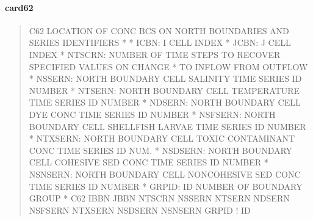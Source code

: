 \documentclass[letterpaper,10pt,english]{sphinxmanual}
\begin{document}
\paragraph{card62}
\label{\detokenize{inputfiles/runcontrol/card62:card62}}\label{\detokenize{inputfiles/runcontrol/card62::doc}}\begin{quote}

\begin{sphinxVerbatim}[commandchars=\\\{\}]
\PYGZhy{}\PYGZhy{}\PYGZhy{}\PYGZhy{}\PYGZhy{}\PYGZhy{}\PYGZhy{}\PYGZhy{}\PYGZhy{}\PYGZhy{}\PYGZhy{}\PYGZhy{}\PYGZhy{}\PYGZhy{}\PYGZhy{}\PYGZhy{}\PYGZhy{}\PYGZhy{}\PYGZhy{}\PYGZhy{}\PYGZhy{}\PYGZhy{}\PYGZhy{}\PYGZhy{}\PYGZhy{}\PYGZhy{}\PYGZhy{}\PYGZhy{}\PYGZhy{}\PYGZhy{}\PYGZhy{}\PYGZhy{}\PYGZhy{}\PYGZhy{}\PYGZhy{}\PYGZhy{}\PYGZhy{}\PYGZhy{}\PYGZhy{}\PYGZhy{}\PYGZhy{}\PYGZhy{}\PYGZhy{}\PYGZhy{}\PYGZhy{}\PYGZhy{}\PYGZhy{}\PYGZhy{}\PYGZhy{}\PYGZhy{}\PYGZhy{}\PYGZhy{}\PYGZhy{}\PYGZhy{}\PYGZhy{}\PYGZhy{}\PYGZhy{}\PYGZhy{}\PYGZhy{}\PYGZhy{}\PYGZhy{}\PYGZhy{}\PYGZhy{}\PYGZhy{}\PYGZhy{}\PYGZhy{}\PYGZhy{}\PYGZhy{}\PYGZhy{}\PYGZhy{}\PYGZhy{}\PYGZhy{}\PYGZhy{}\PYGZhy{}\PYGZhy{}\PYGZhy{}\PYGZhy{}\PYGZhy{}
C62 LOCATION OF CONC BC\PYGZsq{}S ON NORTH BOUNDARIES AND SERIES IDENTIFIERS
*
*  ICBN:    I CELL INDEX
*  JCBN:    J CELL INDEX
*  NTSCRN:  NUMBER OF TIME STEPS TO RECOVER SPECIFIED VALUES ON CHANGE
*           TO INFLOW FROM OUTFLOW
*  NSSERN:  NORTH BOUNDARY CELL SALINITY TIME SERIES ID NUMBER
*  NTSERN:  NORTH BOUNDARY CELL TEMPERATURE TIME SERIES ID NUMBER
*  NDSERN:  NORTH BOUNDARY CELL DYE CONC TIME SERIES ID NUMBER
*  NSFSERN: NORTH BOUNDARY CELL SHELLFISH LARVAE TIME SERIES ID NUMBER
*  NTXSERN: NORTH BOUNDARY CELL TOXIC CONTAMINANT CONC TIME SERIES ID NUM.
*  NSDSERN: NORTH BOUNDARY CELL COHESIVE SED CONC TIME SERIES ID NUMBER
*  NSNSERN: NORTH BOUNDARY CELL NON\PYGZhy{}COHESIVE SED CONC TIME SERIES ID NUMBER
*    GRPID: ID NUMBER OF BOUNDARY GROUP
*
C62    IBBN    JBBN  NTSCRN  NSSERN  NTSERN  NDSERN NSFSERN NTXSERN NSDSERN NSNSERN      GRPID ! ID
\end{sphinxVerbatim}
\end{quote}
\end{document}
